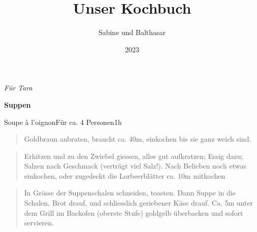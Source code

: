 \documentclass[
  a4paper,
]{article}
\title{Unser Kochbuch}
\author{Sabine und Balthasar}
\date{2023}
\begin{document}
\maketitle
\thispagestyle{empty}



\newpage
\vspace*{\fill}

\hfill\textit{\Large Für Tara} \vspace*{\fill} \thispagestyle{empty}
\newpage

\newpage
\vspace*{\fill}

\textbf{\Huge \sf Suppen} \vspace*{\fill} \thispagestyle{empty} \newpage

\begin{recipe}{Soupe à l’oignon}{Für ca. 4 Personen}{1h}


\begin{quote}
Goldbraun anbraten, braucht ca. 40m, einkochen bis sie ganz weich sind.
\end{quote}

\freeform\hrulefill


\begin{quote}
Erhitzen und zu den Zwiebel giessen, alles gut aufkratzen; Essig dazu;
Salzen nach Geschmack (verträgt viel Salz!). Nach Belieben noch etwas
einkochen, oder zugedeckt die Lorbeerblätter ca. 10m mitkochen
\end{quote}

\freeform\hrulefill


\begin{quote}
In Grösse der Suppenschalen schneiden, toasten. Dann Suppe in die
Schalen, Brot drauf, und schliesslich geriebener Käse drauf. Ca. 5m
unter dem Grill im Backofen (oberste Stufe) goldgelb überbacken und
sofort servieren.
\end{quote}

\freeform\hrulefill\newline{}\end{recipe}
\end{document}
